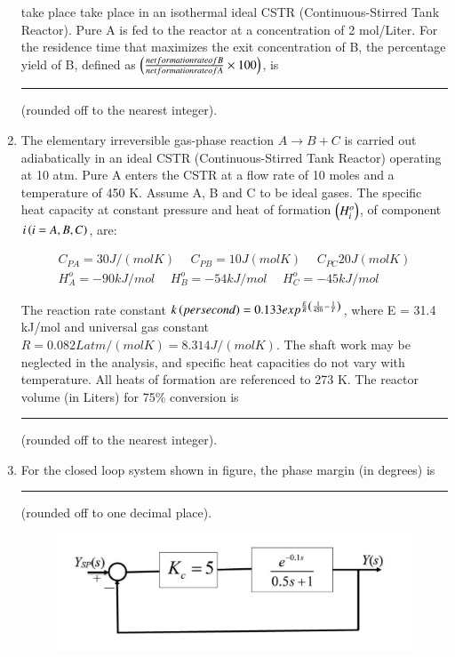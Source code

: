 \documentclass[journal,12pt,onecolumn]{IEEEtran}
\theoremstyle{remark}
\begin{document}
\begin{enumerate}
    take place take place in an isothermal ideal CSTR (Continuous-Stirred Tank Reactor). Pure A is fed to the reactor at a concentration of 2 mol/Liter. For the residence time that maximizes the exit concentration of B, the percentage yield of B, defined as $\left(\frac{net formation rate of B}{net formation rate of A} \times 100\right)$, is \rule{1.5cm}{0.1mm}(rounded off to the nearest integer).
    
\hfill{}

    \item The elementary irreversible gas-phase reaction $A \to B + C$ is carried out adiabatically in an ideal CSTR (Continuous-Stirred Tank Reactor) operating at 10 atm. Pure A enters the CSTR at a flow rate of 10 moles and a temperature of 450 K. Assume A, B and C to be ideal gases. The specific heat capacity at constant pressure   and heat of formation $\left(H^{o}_{i}\right)$, of component $i \left(i = A, B, C\right)$, are: 

    \begin{align*}
        C_{PA} = 30J/(mol K) \hspace{15pt} C_{PB} = 10J(mol K) \hspace{15pt} C_{PC} 20J(mol K) \\ 
        H^{o}_{A} = -90 kJ/mol \hspace{15pt} H^{o}_{B} = -54 kJ/mol \hspace{15pt} H^{o}_{C} = -45 kJ/mol 
    \end{align*}

    The reaction rate constant $k \left(per second\right) = 0.133 exp^{\frac{E}{R}\left(\frac{1}{450} - \frac{1}{T}\right)}$, where E = 31.4 kJ/mol and universal gas constant $R = 0.082 L atm/(mol K) = 8.314 J/(mol K)$. The shaft work may be neglected in the analysis, and specific heat capacities do not vary with temperature. All heats of formation are referenced to 273 K. The reactor volume (in Liters) for 75\% conversion is \rule{1.5cm}{0.1mm}(rounded off to the nearest integer). 
    
\hfill{}
\newpage
    \item For the closed loop system shown in figure, the phase margin (in degrees) is \rule{2cm}{0.1mm}(rounded off to one decimal place). 
    
\hfill{}
    \begin{figure}[H]
        \centering
        \includegraphics[width=0.5\columnwidth]{Fig/49.png}
        \caption*{}
        \label{fig: 49}
    \end{figure}


\end{enumerate}
\end{document}
